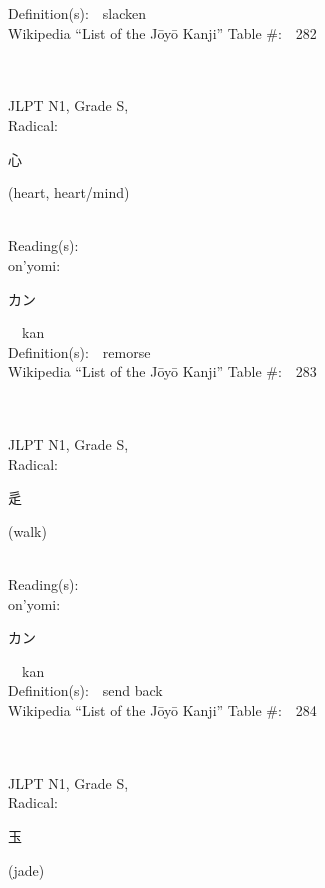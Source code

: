 \begin{multicols}{2}
Definition(s):\ \ slacken \\
Wikipedia ``List of the J\=oy\=o Kanji'' Table \#:\ \ 282 \\
\ \ \\
{\fontsize{34pt}{40pt}  }\ \ \\
{JLPT N1, Grade S, \\Radical:\ \ {\begin{CJK}{UTF8}{min} 心 \end{CJK}} (heart, heart/mind) } \\
Reading(s):\ \ \\
{\hspace*{1em}}on'yomi:\ \ \\
{\hspace*{2em}}{\begin{CJK}{UTF8}{min} カン \end{CJK}}\ \ kan\ \ \\
Definition(s):\ \ remorse \\
Wikipedia ``List of the J\=oy\=o Kanji'' Table \#:\ \ 283 \\
\ \ \\
{\fontsize{34pt}{40pt}  }\ \ \\
{JLPT N1, Grade S, \\Radical:\ \ {\begin{CJK}{UTF8}{min} 辵 \end{CJK}} (walk) } \\
Reading(s):\ \ \\
{\hspace*{1em}}on'yomi:\ \ \\
{\hspace*{2em}}{\begin{CJK}{UTF8}{min} カン \end{CJK}}\ \ kan\ \ \\
Definition(s):\ \ send back \\
Wikipedia ``List of the J\=oy\=o Kanji'' Table \#:\ \ 284 \\
\ \ \\
{\fontsize{34pt}{40pt}  }\ \ \\
{JLPT N1, Grade S, \\Radical:\ \ {\begin{CJK}{UTF8}{min} 玉 \end{CJK}} (jade) } \\

\end{multicols}
